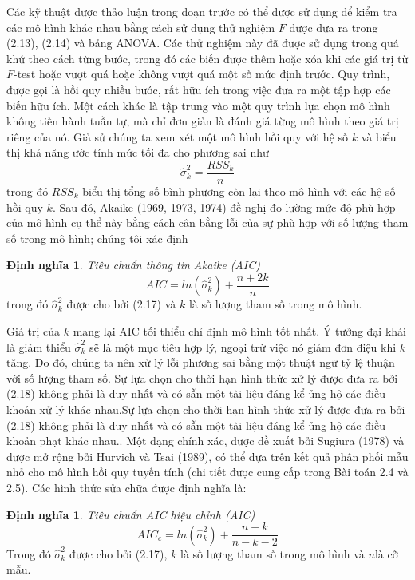 \documentclass[12pt, a4paper,oneside]{book}
\theoremstyle{definition}
\newtheorem{dn}[theo]{Định nghĩa}
\begin{document}
Các kỹ thuật được thảo luận trong đoạn trước có thể được sử dụng để kiểm tra các mô hình khác nhau bằng cách sử dụng thử nghiệm $ F $ được đưa ra trong (2.13), (2.14) và bảng ANOVA. Các thử nghiệm này đã được sử dụng trong quá khứ theo cách từng bước, trong đó các biến được thêm hoặc xóa khi các giá trị từ $F$-test hoặc vượt quá hoặc không vượt quá một số mức định trước. Quy trình, được gọi là hồi quy nhiều bước, rất hữu ích trong việc đưa ra một tập hợp các biến hữu ích. Một cách khác là tập trung vào một quy trình lựa chọn mô hình không tiến hành tuần tự, mà chỉ đơn giản là đánh giá từng mô hình theo giá trị riêng của nó. Giả sử chúng ta xem xét một mô hình hồi quy với hệ số $ k $ và biểu thị khả năng  ước tính mức tối đa cho phương sai như	
$$\hat{\sigma}_{k}^{2}=\dfrac{RSS_{k}}{n}$$
trong đó $ RSS_{k} $ biểu thị tổng số bình phương còn lại theo mô hình với các hệ số hồi quy $ k $. Sau đó, Akaike (1969, 1973, 1974) đề nghị đo lường mức độ phù hợp của mô hình cụ thể này bằng cách cân bằng lỗi của sự phù hợp với số lượng tham số trong mô hình; chúng tôi xác định 
\begin{dn}	
	\textit{Tiêu chuẩn thông tin Akaike (AIC)} 
	$$AIC= ln (\hat{\sigma}_{k}^{2}) +\dfrac{n+ 2k}{n}$$
	trong đó $ \hat{\sigma}_{k}^{2} $ được cho bởi (2.17) và $ k $ là số lượng tham số trong mô hình.
\end{dn}
Giá trị của $ k $ mang lại AIC tối thiểu chỉ định mô hình tốt nhất. Ý tưởng đại khái là giảm thiểu $ \hat{\sigma}_{k}^{2} $ sẽ là một mục tiêu hợp lý, ngoại trừ việc nó giảm đơn điệu khi $ k $ tăng. Do đó, chúng ta nên xử lý lỗi phương sai  bằng một thuật ngữ tỷ lệ thuận với số lượng tham số. Sự lựa chọn cho thời hạn hình thức xử lý được đưa ra bởi (2.18) không phải là duy nhất và có sẵn một tài liệu đáng kể ủng hộ các điều khoản xử lý khác nhau.Sự lựa chọn cho thời hạn hình thức xử lý được đưa ra bởi (2.18) không phải là duy nhất và có sẵn một tài liệu đáng kể ủng hộ các điều khoản phạt khác nhau.. Một dạng chính xác, được đề xuất bởi Sugiura (1978) và được mở rộng bởi Hurvich và Tsai (1989), có thể dựa trên kết quả phân phối mẫu nhỏ cho mô hình hồi quy tuyến tính (chi tiết được cung cấp trong Bài toán 2.4 và 2.5). Các hình thức sửa chữa được định nghĩa là:
\begin{dn}	
	\textit{Tiêu chuẩn AIC hiệu chỉnh (AIC)} 
	$$AIC_{c}= ln (\hat{\sigma}_{k}^{2}) +\dfrac{n+ k}{n-k-2}$$
	Trong đó $ \hat{\sigma}_{k}^{2} $ được cho bởi (2.17), $ k $ là số lượng tham số trong mô hình và $ n  $là cỡ mẫu.
	
\end{dn}
\end{document}
